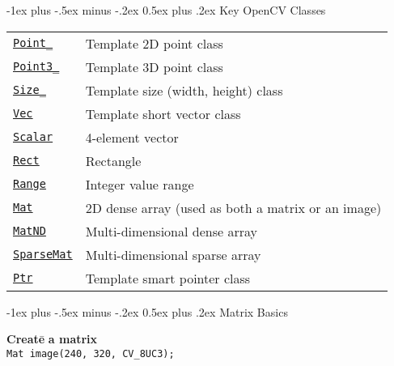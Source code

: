 \documentclass[10pt,landscape]{article}
\makeatletter
\renewcommand{\section}{\@startsection{section}{1}{0mm}%
                                {-1ex plus -.5ex minus -.2ex}%
                                {0.5ex plus .2ex}%
                                {\normalfont\large\bfseries}}
\makeatother
\begin{document}
\begin{multicols}{3}
\section{Key OpenCV Classes}
\begin{tabular}{@{}p{\the\MyLen}%
                @{}p{\linewidth-\the\MyLen}@{}}
\texttt{\href{http://opencv.willowgarage.com/documentation/cpp/basic_structures.html\#point}{Point\_}} & Template 2D point class \\
\texttt{\href{http://opencv.willowgarage.com/documentation/cpp/basic_structures.html\#point3}{Point3\_}} & Template 3D point class \\
\texttt{\href{http://opencv.willowgarage.com/documentation/cpp/basic_structures.html\#size}{Size\_}} & Template size (width, height) class \\
\texttt{\href{http://opencv.willowgarage.com/documentation/cpp/basic_structures.html\#vec}{Vec}} & Template short vector class \\
\texttt{\href{http://opencv.willowgarage.com/documentation/cpp/basic_structures.html\#scalar}{Scalar}} & 4-element vector \\
\texttt{\href{http://opencv.willowgarage.com/documentation/cpp/basic_structures.html\#rect}{Rect}} & Rectangle \\
\texttt{\href{http://opencv.willowgarage.com/documentation/cpp/basic_structures.html\#range}{Range}} & Integer value range \\
\texttt{\href{http://opencv.willowgarage.com/documentation/cpp/basic_structures.html\#mat}{Mat}} & 2D dense array (used as both a matrix or an image)\\
\texttt{\href{http://opencv.willowgarage.com/documentation/cpp/basic_structures.html\#matnd}{MatND}} & Multi-dimensional dense array \\
\texttt{\href{http://opencv.willowgarage.com/documentation/cpp/basic_structures.html\#sparsemat}{SparseMat}} & Multi-dimensional sparse array \\
\texttt{\href{http://opencv.willowgarage.com/documentation/cpp/basic_structures.html\#ptr}{Ptr}} & Template smart pointer class
\end{tabular}

\section{Matrix Basics}
\begin{tabbing}

\textbf{Cr}\=\textbf{ea}\=\textbf{te}\={} \textbf{a matrix} \\
\> \texttt{Mat image(240, 320, CV\_8UC3);} \\


\end{tabbing}
\end{multicols}
\end{document}
